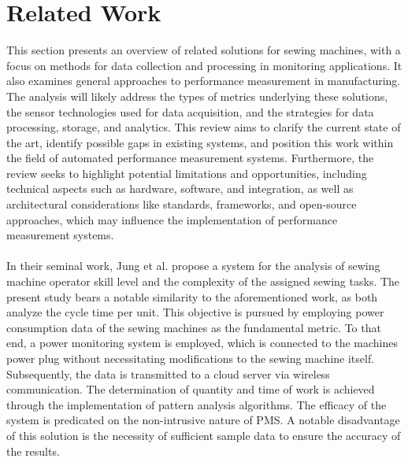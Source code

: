 \clearpage
\chapter{\textbf{Related Work}}\label{relatedWork}
This section presents an overview of related solutions for sewing machines, with a focus on methods for data collection and processing in monitoring applications. It also examines general approaches to performance measurement in manufacturing. The analysis will likely address the types of metrics underlying these solutions, the sensor technologies used for data acquisition, and the strategies for data processing, storage, and analytics. This review aims to clarify the current state of the art, identify possible gaps in existing systems, and position this work within the field of automated performance measurement systems. Furthermore, the review seeks to highlight potential limitations and opportunities, including technical aspects such as hardware, software, and integration, as well as architectural considerations like standards, frameworks, and open-source approaches, which may influence the implementation of performance measurement systems.
\\\\
In their seminal work, Jung et al. \cite{jungRemoteSensingSewing2020} propose a system for the analysis of sewing machine operator skill level and the complexity of the assigned sewing tasks. The present study bears a notable similarity to the aforementioned work, as both analyze the cycle time per unit. This objective is pursued by employing power consumption data of the sewing machines as the fundamental metric. To that end, a power monitoring system is employed, which is connected to the machines power plug without necessitating modifications to the sewing machine itself. Subsequently, the data is transmitted to a cloud server via wireless communication. The determination of quantity and time of work is achieved through the implementation of pattern analysis algorithms. The efficacy of the system is predicated on the non-intrusive nature of PMS. A notable disadvantage of this solution is the necessity of sufficient sample data to ensure the accuracy of the results.\\
